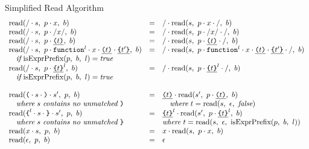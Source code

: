 \documentclass[9pt]{sigplanconf}
\begin{document}
\begin{displayfigure*}{\label{fig:simpleread}Simplified Read Algorithm}
\[\begin{array}{lcll}
    \textrm{read}(/\cdot s,~p\cdot x,~b)
    &=&
    / \cdot 
      \textrm{read}(s,~
        p\cdot x\cdot /
      ,~b)
   
    \\
    \textrm{read}(/\cdot s,~p \cdot /x/,~b)
    &=&
    / \cdot 
      \textrm{read}(s,~
        p \cdot /x/ \cdot /
      ,~b)
   
    \\
    \textrm{read}(/\cdot s,~p \cdot \underline{ \texttt{(} t \texttt{)}},~b)
    &=&
    / \cdot 
      \textrm{read}(s,~
        p \cdot \underline{ \texttt{(} t \texttt{)}} \cdot /
      ,~b)
   
    \\
    \textrm{read}(/\cdot s,~
      p  \cdot \texttt{function}^l \cdot x
      \cdot \underline{ \texttt{(} t \texttt{)}} \cdot \underline{ \texttt{\{} t' \texttt{\}} }
    ,~b)
    &=&
    / \cdot 
      \textrm{read}(s,~
        p  \cdot \texttt{function}^l \cdot x \cdot \underline{ \texttt{(} t \texttt{)}}
        \cdot \underline{ \texttt{\{} t' \texttt{\}} } \cdot /
      ,~b)
   
    \\
    \quad \textit{if}~\textrm{isExprPrefix}(p,~b,~l)= \textit{true}
    \\
    \textrm{read}(/\cdot s,~
      p \cdot \underline{ \texttt{\{} t \texttt{\}} }^{l}
    ,~b)
    &=&
    / \cdot 
      \textrm{read}(s,~
        p \cdot \underline{ \texttt{\{} t \texttt{\}} }^{l} \cdot /
      ,~b)
   
    \\
    \quad \textit{if}~\textrm{isExprPrefix}(p,~b,~l)= \textit{true}

    \\ \\
    

    \textrm{read}(\texttt{(} \cdot s \cdot \texttt{)} \cdot s',~p,~b)
    &=&
    \underline{ \texttt{(} t \texttt{)}} \cdot 
      \textrm{read}(s',~p \cdot \underline{ \texttt{(} t \texttt{)}},~b)
    
    \\
    \quad \textit{where}~s~\textit{contains no unmatched}~\texttt{)} 
    &&\quad \textit{where}~t = \textrm{read}(s,~\epsilon,~\textit{false}) 
    \\
    \textrm{read}(
      \texttt{\{}^l \cdot s \cdot \texttt{\}} \cdot s'
    ,~p,~b)
    &=&
    \underline{ \texttt{\{} t \texttt{\}} }^l \cdot 
      \textrm{read}(s',~
        p \cdot \underline{ \texttt{\{} t \texttt{\}} }^l
      ,~b)
    
    \\
    \quad \textit{where}~s~\textit{contains no unmatched}~\texttt{\}} 
    && \textit{where}~t = \textrm{read}(s,~\epsilon,~\textrm{isExprPrefix}(p,~b,~l))
    \\
    \textrm{read}(x \cdot s,~p,~b)
    &=&
    x \cdot 
      \textrm{read}(s,~p \cdot x,~b)
   
    \\
    \textrm{read}(\epsilon,~p,~b)
    &=&
    \epsilon \\
  \end{array}
\]
\end{displayfigure*}
\end{document}
